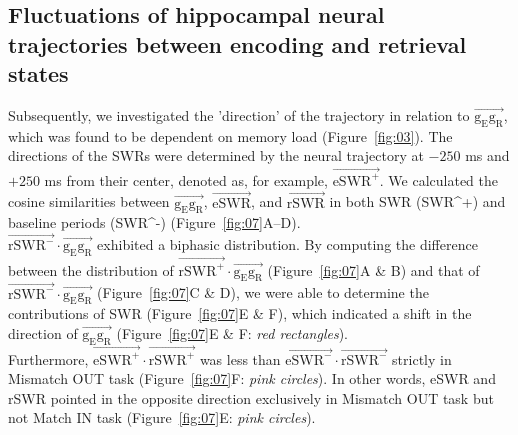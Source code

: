 \documentclass[final,3p,times,twocolumn]{elsarticle}
\begin{document}
\subsection{Fluctuations of hippocampal neural trajectories between encoding and retrieval states}
Subsequently, we investigated the 'direction' of the trajectory in relation to $\overrightarrow{\mathrm{g_{E}g_{R}}}$, which was found to be dependent on memory load (Figure~\ref{fig:03}). The directions of the SWRs were determined by the neural trajectory at $-250$ ms and $+250$ ms from their center, denoted as, for example, $\overrightarrow{\mathrm{eSWR^+}}$. We calculated the cosine similarities between $\overrightarrow{\mathrm{g_{E}g_{R}}}$, $\overrightarrow{\mathrm{eSWR}}$, and $\overrightarrow{\mathrm{rSWR}}$ in both SWR (SWR^+) and baseline periods (SWR^-) (Figure~\ref{fig:07}A--D).
\\
\indent
$\overrightarrow{\mathrm{rSWR^-}} \cdot \overrightarrow{\mathrm{g_{E}g_{R}}}$ exhibited a biphasic distribution. By computing the difference between the distribution of $\overrightarrow{\mathrm{rSWR^+}} \cdot \overrightarrow{\mathrm{g_{E}g_{R}}}$ (Figure~\ref{fig:07}A \& B) and that of $\overrightarrow{\mathrm{rSWR^-}} \cdot \overrightarrow{\mathrm{g_{E}g_{R}}}$ (Figure~\ref{fig:07}C \& D), we were able to determine the contributions of SWR (Figure~\ref{fig:07}E \& F), which indicated a shift in the direction of $\overrightarrow{\mathrm{g_{E}g_{R}}}$ (Figure~\ref{fig:07}E \& F: \textit{red rectangles}). 
\\
\indent
Furthermore, $\overrightarrow{\mathrm{eSWR^+}} \cdot \overrightarrow{\mathrm{rSWR^+}}$ was less than $\overrightarrow{\mathrm{eSWR^-}} \cdot \overrightarrow{\mathrm{rSWR^-}}$ strictly in Mismatch OUT task (Figure~\ref{fig:07}F: \textit{pink circles}). In other words, eSWR and rSWR pointed in the opposite direction exclusively in Mismatch OUT task but not Match IN task (Figure~\ref{fig:07}E: \textit{pink circles}).
\label{sec:results}
\end{document}
